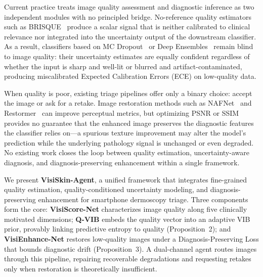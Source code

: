 Current practice treats image quality assessment and diagnostic inference as two independent modules with no principled bridge.
No-reference quality estimators such as BRISQUE~\cite{mittal2012making} produce a scalar signal that is neither calibrated to clinical relevance nor integrated into the uncertainty output of the downstream classifier.
As a result, classifiers based on MC Dropout~\cite{gal2016dropout} or Deep Ensembles~\cite{lakshminarayanan2017simple} remain blind to image quality: their uncertainty estimates are equally confident regardless of whether the input is sharp and well-lit or blurred and artifact-contaminated, producing miscalibrated Expected Calibration Errors (ECE) on low-quality data.

When quality is poor, existing triage pipelines offer only a binary choice: accept the image or ask for a retake.
Image restoration methods such as NAFNet~\cite{chen2022simple} and Restormer~\cite{zamir2022restormer} can improve perceptual metrics, but optimizing PSNR or SSIM provides no guarantee that the enhanced image preserves the diagnostic features the classifier relies on—a spurious texture improvement may alter the model's prediction while the underlying pathology signal is unchanged or even degraded.
No existing work closes the loop between quality estimation, uncertainty-aware diagnosis, and diagnosis-preserving enhancement within a single framework.

We present \textbf{VisiSkin-Agent}, a unified framework that integrates fine-grained quality estimation, quality-conditioned uncertainty modeling, and diagnosis-preserving enhancement for smartphone dermoscopy triage.
Three components form the core: \textbf{VisiScore-Net} characterizes image quality along five clinically motivated dimensions; \textbf{Q-VIB} embeds the quality vector into an adaptive VIB prior, provably linking predictive entropy to quality (Proposition~2); and \textbf{VisiEnhance-Net} restores low-quality images under a Diagnosis-Preserving Loss that bounds diagnostic drift (Proposition~3).
A dual-channel agent routes images through this pipeline, repairing recoverable degradations and requesting retakes only when restoration is theoretically insufficient.

